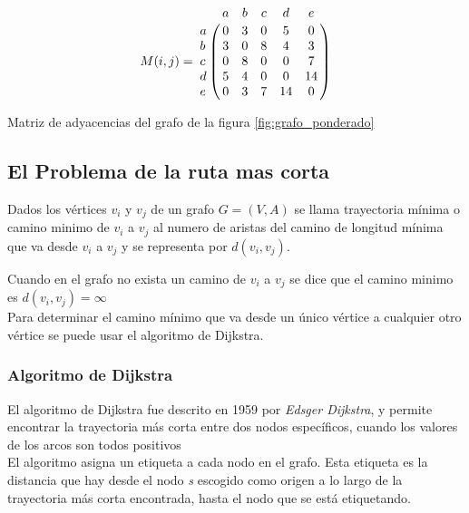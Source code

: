         \begin{table}[H]
          \begin{center}
            \begin{displaymath}
              M(i,j) =
              \bordermatrix{ ~ & a & b & c & d & e \cr
                             a & 0 & 3 & 0 & 5 & 0 \cr
                             b & 3 & 0 & 8 & 4 & 3 \cr
                             c & 0 & 8 & 0 & 0 & 7 \cr
                             d & 5 & 4 & 0 & 0 & 14\cr
                             e & 0 & 3 & 7 & 14& 0  }
            \end{displaymath}
            \caption*{Matriz de adyacencias del grafo de la figura  \ref{fig:grafo_ponderado}}
          \end{center}
        \end{table}



    \subsection{El Problema de la ruta mas corta} %
    \label{sub:ruta_mas_corta}
      Dados los vértices $v_{i}$ y $v_{j}$ de un grafo $G = (V,A)$ se llama trayectoria mínima o camino minimo  de \(v_i\) a \(v_j\) al numero de aristas del camino de longitud mínima que va desde $v_i$ a $v_j$ y se representa por $d(v_i, v_j)$.

      Cuando en el grafo no exista un camino de $v_i$ a $v_j$ se dice que el camino minimo es $d(v_i, v_j) = \infty$ \\

      Para determinar el camino mínimo que va desde un único vértice a cualquier otro vértice se puede usar el algoritmo de Dijkstra.



      \subsubsection{Algoritmo de Dijkstra} %
      \label{subs:algoritmo_de_dijkstra}
      El algoritmo de  Dijkstra fue descrito en 1959 por \emph{Edsger Dijkstra}, y permite encontrar la trayectoria más corta entre dos nodos específicos, cuando los valores de los arcos son todos positivos\\

      El algoritmo asigna un etiqueta a cada nodo en el grafo. Esta etiqueta es la distancia que hay desde el nodo \emph{s} escogido como origen a lo largo de la trayectoria más corta encontrada, hasta el nodo que se está etiquetando.\\

